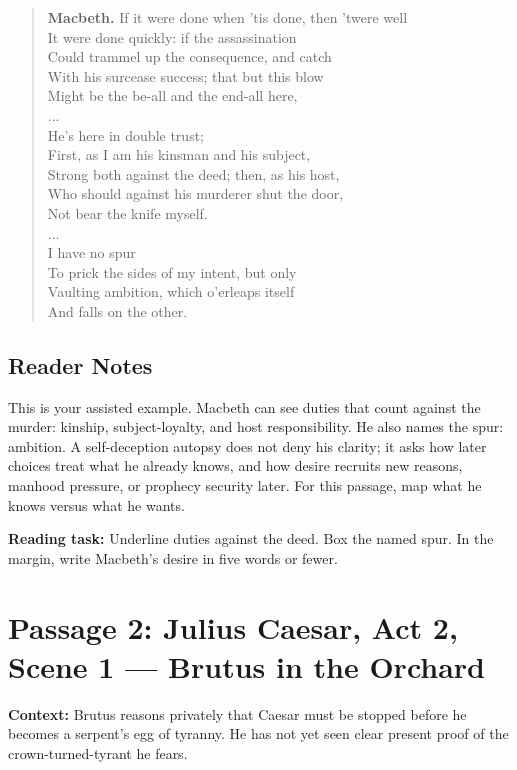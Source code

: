 \documentclass[12pt]{article}
\newenvironment{playpassage}{\begin{quote}\footnotesize\setlength{\parskip}{0.08em}\setlength{\parindent}{0pt}}{\end{quote}}
\newcommand{\speaker}[1]{\textbf{#1.}}
\begin{document}
\begin{playpassage}
\speaker{Macbeth} If it were done when 'tis done, then 'twere well\\
It were done quickly: if the assassination\\
Could trammel up the consequence, and catch\\
With his surcease success; that but this blow\\
Might be the be-all and the end-all here,\\
...\\
He's here in double trust;\\
First, as I am his kinsman and his subject,\\
Strong both against the deed; then, as his host,\\
Who should against his murderer shut the door,\\
Not bear the knife myself.\\
...\\
I have no spur\\
To prick the sides of my intent, but only\\
Vaulting ambition, which o'erleaps itself\\
And falls on the other.
\end{playpassage}

\subsection*{Reader Notes}

This is your assisted example. Macbeth can see duties that count against the murder: kinship, subject-loyalty, and host responsibility. He also names the spur: ambition. A self-deception autopsy does not deny his clarity; it asks how later choices treat what he already knows, and how desire recruits new reasons, manhood pressure, or prophecy security later. For this passage, map what he knows versus what he wants.

\textbf{Reading task:} Underline duties against the deed. Box the named spur. In the margin, write Macbeth's desire in five words or fewer.

\newpage

\section*{Passage 2: Julius Caesar, Act 2, Scene 1 --- Brutus in the Orchard}

\textbf{Context:} Brutus reasons privately that Caesar must be stopped before he becomes a serpent's egg of tyranny. He has not yet seen clear present proof of the crown-turned-tyrant he fears.
\end{document}

